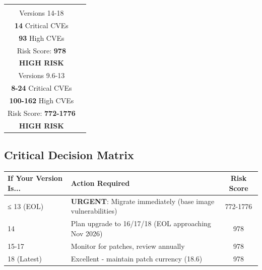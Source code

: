 \documentclass[11pt, a4paper]{article}
\begin{document}
\begin{center}
\begin{tabular}{cc}
\begin{minipage}{0.45\textwidth}
\begin{tcolorbox}[colback=lightorange!30, colframe=vuln-high, title=\textbf{✓ Supported Versions}, fonttitle=\bfseries]
\centering
\Huge\textbf{5}\\
\normalsize Versions 14-18\\[0.3cm]
\large\textbf{14} Critical CVEs\\
\large\textbf{93} High CVEs\\[0.2cm]
\small Risk Score: \textbf{978}\\
\textcolor{vuln-critical}{\textbf{HIGH RISK}}
\end{tcolorbox}
\end{minipage}
&
\begin{minipage}{0.45\textwidth}
\begin{tcolorbox}[colback=lightred, colframe=gantt-eol, title=\textbf{✗ End-of-Life Versions}, fonttitle=\bfseries]
\centering
\Huge\textbf{5}\\
\normalsize Versions 9.6-13\\[0.3cm]
\large\textbf{8-24} Critical CVEs\\
\large\textbf{100-162} High CVEs\\[0.2cm]
\small Risk Score: \textbf{772-1776}\\
\textcolor{vuln-critical}{\textbf{HIGH RISK}}
\end{tcolorbox}
\end{minipage}
\end{tabular}
\end{center}

\vspace{0.5cm}

\subsection*{Critical Decision Matrix}

\begin{center}
\begin{tabular}{|l|l|c|}
\hline
\rowcolor{lightgray}
\textbf{If Your Version Is...} & \textbf{Action Required} & \textbf{Risk Score} \\ \hline
\rowcolor{lightred} ≤ 13 (EOL) & \textbf{URGENT}: Migrate immediately (base image vulnerabilities) & 772-1776 \\ \hline
\rowcolor{lightorange} 14 & Plan upgrade to 16/17/18 (EOL approaching Nov 2026) & 978 \\ \hline
\rowcolor{lightorange} 15-17 & Monitor for patches, review annually & 978 \\ \hline
\rowcolor{lightorange} 18 (Latest) & Excellent - maintain patch currency (18.6) & 978 \\ \hline
\end{tabular}
\end{center}
\end{document}
